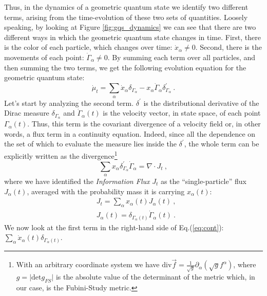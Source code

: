 \documentclass[draft,nofootinbib,pre,twocolumn,showpacs,showkeys,preprintnumbers,floatfix]{revtex4-1}
\newcommand{\1}{\mathbbm{1}}
\begin{document}
Thus, in the dynamics of a geometric quantum state we identify two different terms, arising from the 
time-evolution of these two sets of quantities. Loosely speaking, by looking at Figure \ref{fig:gqs_dynamics}
we can see that there are two different ways in which the geometric quantum state changes 
in time. First, there is the color of each particle, which changes over time: $\dot{x}_\alpha \neq 0$. Second, there is
the movements of each point: $\dot{\Gamma}_\alpha \neq 0$. By summing each term over
all particles, and then summing the two terms, we get the following evolution equation for the geometric quantum state:
\begin{equation}
\dot{\mu}_t = \sum_\alpha \dot{x}_\alpha \delta_{\Gamma_\alpha} - x_\alpha \dot{\Gamma}_{\alpha} \delta^{'}_{\Gamma_\alpha} ~.\label{eq:cont}
\end{equation}
Let's start by analyzing the second term. $\delta^{'}$ is the distributional derivative 
of the Dirac measure $\delta_{\Gamma_\alpha}$ and $\dot{\Gamma}_\alpha(t)$ is 
the velocity vector, in state space, of each point $\Gamma_\alpha(t)$. Thus, this term 
is the covariant divergence of a velocity field or, in other words, a flux term in a continuity equation. 
Indeed, since all the dependence on the set of which to evaluate the measure lies inside the $\delta^{'}$, 
the whole term can be explicitly written as the divergence\footnote{With an arbitrary coordinate system we have 
$\mathrm{div} \vec{f} = \frac{1}{\sqrt{g}} \partial_\alpha \left(\sqrt{g} f^\alpha\right)$,
where $g = \vert \mathrm{det} g_{FS}\vert$ is the absolute value of the determinant of the metric which, 
in our case, is the Fubini-Study metric.}
\begin{equation}
\sum_\alpha x_\alpha \delta^{'}_{\Gamma_\alpha} \dot{\Gamma}_{\alpha} = \nabla \cdot J_t~,
\end{equation}
where we have identified the \emph{Information Flux} $J_t$ as the ``single-particle'' flux $J_\alpha(t)$, averaged
with the probability mass it is carrying $x_\alpha(t)$:
\begin{subequations}\label{eq:flux}
\begin{align}
&J_t = \sum_\alpha x_\alpha(t)J_\alpha(t)~,\\
&J_\alpha(t) =  \delta_{\Gamma_\alpha(t)} \dot{\Gamma}_{\alpha}(t)~.
\end{align}
\end{subequations}
We now look at the first term in the right-hand side of Eq.(\ref{eq:cont}): $\sum_\alpha \dot{x}_\alpha(t) \delta_{\Gamma_\alpha(t)}$.
\end{document}
